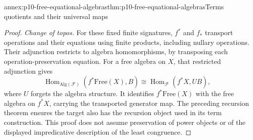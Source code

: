 \begin{annexitem}{annex:p10-free-equational-algebras}{thm:p10-free-equational-algebras}{Terms quotients and their universal maps}
\begin{proof}
\emph{Change of topos.}
For these fixed finite signatures, \(f^*\) and \(f_*\)
transport operations and their equations using finite
products, including nullary operations.
Their adjunction restricts to algebra homomorphisms, by
transposing each operation-preservation equation.
For a free algebra on \(X\), that restricted adjunction gives
\[
 \operatorname{Hom}_{\mathrm{Alg}(\mathcal F)}
       (f^*\mathrm{Free}(X),B)
 \cong
 \operatorname{Hom}_{\mathcal F}(f^*X,UB),
\]
where \(U\) forgets the algebra structure.
It identifies \(f^*\mathrm{Free}(X)\) with the free algebra
on \(f^*X\), carrying the transported generator map.
The preceding recursion theorem ensures the target also
has the recursion object used in its term construction.
This proof does not assume preservation of power objects
or of the displayed impredicative description of the
least congruence.
\end{proof}
\end{annexitem}

